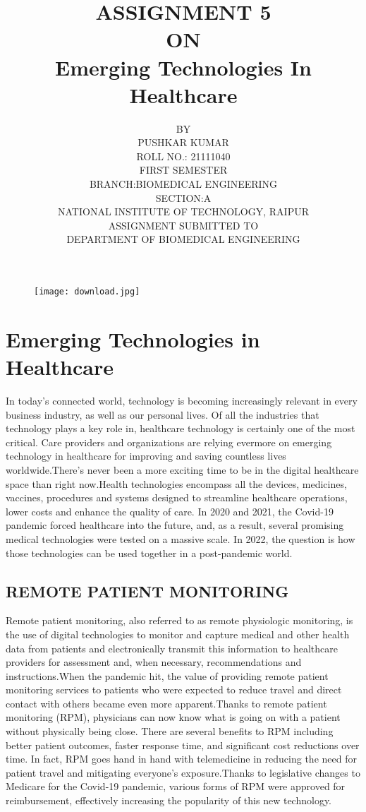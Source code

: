 \documentclass{article}
\title{ASSIGNMENT 5\\ON\\Emerging Technologies In Healthcare​​}
\author{BY\\PUSHKAR KUMAR\\ROLL NO.: 21111040\\FIRST SEMESTER\\BRANCH:BIOMEDICAL ENGINEERING\\SECTION:A\\NATIONAL INSTITUTE OF TECHNOLOGY, RAIPUR\\ASSIGNMENT SUBMITTED TO\\
DEPARTMENT OF BIOMEDICAL ENGINEERING}
\date{}
\begin{document}
\maketitle
\begin{figure}[h]
    \centering
    \texttt{[image: download.jpg]}
\end{figure}


\section{Emerging Technologies in Healthcare} 
In today’s connected world, technology is becoming increasingly relevant in every business industry, as well as our personal lives. Of all the industries that technology plays a key role in, healthcare technology is certainly one of the most critical. Care providers and organizations are relying evermore on emerging technology in healthcare for improving and saving countless lives worldwide.There’s never been a more exciting time to be in the digital healthcare space than right now.Health technologies encompass all the devices, medicines, vaccines, procedures and systems designed to streamline healthcare operations, lower costs and enhance the quality of care. In 2020 and 2021, the Covid-19 pandemic forced healthcare into the future, and, as a result, several promising medical technologies were tested on a massive scale. In 2022, the question is how those technologies can be used together in a post-pandemic world.
\subsection{ REMOTE PATIENT MONITORING}
Remote patient monitoring, also referred to as remote physiologic monitoring, is the use of digital technologies to monitor and capture medical and other health data from patients and electronically transmit this information to healthcare providers for assessment and, when necessary, recommendations and instructions.When the pandemic hit, the value of providing remote patient monitoring services to patients who were expected to reduce travel and direct contact with others became even more apparent.Thanks to remote patient monitoring (RPM), physicians can now know what is going on with a patient without physically being close. There are several benefits to RPM including better patient outcomes, faster response time, and significant cost reductions over time. In fact, RPM goes hand in hand with telemedicine in reducing the need for patient travel and mitigating everyone’s exposure.Thanks to legislative changes to Medicare for the Covid-19 pandemic, various forms of RPM were approved for reimbursement, effectively increasing the popularity of this new technology.
\end{document}
